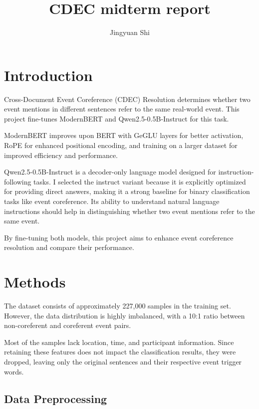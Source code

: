 \documentclass[12pt,a4paper]{article}
\title{CDEC midterm report}
\author{Jingyuan Shi}
\begin{document}
\maketitle


\section{Introduction}

Cross-Document Event Coreference (CDEC) Resolution determines whether two event mentions in different sentences refer to the same real-world event. This project fine-tunes ModernBERT and Qwen2.5-0.5B-Instruct for this task.

ModernBERT improves upon BERT with GeGLU layers for better activation, RoPE for enhanced positional encoding, and training on a larger dataset for improved efficiency and performance.

Qwen2.5-0.5B-Instruct is a decoder-only language model designed for instruction-following tasks. I selected the instruct variant because it is explicitly optimized for providing direct answers, making it a strong baseline for binary classification tasks like event coreference. Its ability to understand natural language instructions should help in distinguishing whether two event mentions refer to the same event.

By fine-tuning both models, this project aims to enhance event coreference resolution and compare their performance.


\section{Methods}

The dataset consists of approximately 227,000 samples in the training set. However, the data distribution is highly imbalanced, with a 10:1 ratio between non-coreferent and coreferent event pairs.

Most of the samples lack location, time, and participant information. Since retaining these features does not impact the classification results, they were dropped, leaving only the original sentences and their respective event trigger words.

\subsection{Data Preprocessing}
\end{document}
